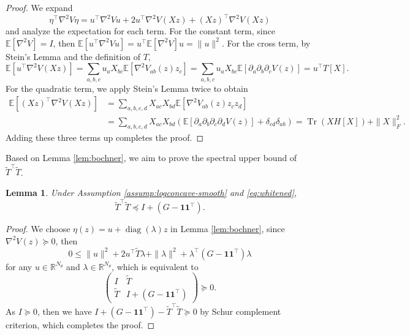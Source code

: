 \documentclass[11pt]{article}
\theoremstyle{plain}
\newtheorem{lemma}[theorem]{Lemma}
\theoremstyle{definition}
\theoremstyle{remark}
\newcommand{\R}{\mathbb{R}}
\newcommand{\E}{\mathbb{E}}
\newcommand{\Tr}{\operatorname{Tr}}
\newcommand{\diag}{\operatorname{diag}}
\begin{document}
\begin{proof}
    We expand 
    \begin{equation*}
        \eta^\top \nabla^2 V \eta = u^\top \nabla^2 V u + 2u^\top \nabla^2 V (Xz) + (Xz)^\top \nabla^2 V (Xz)
    \end{equation*}
    and analyze the expectation for each term.
    For the constant term, since $\E[\nabla^2 V] = I$, then $\E[u^\top \nabla^2 V u] = u^\top \E[\nabla^2 V] u = \|u\|^2$. For the cross term, by Stein's Lemma and the definition of $T$, 
    \begin{equation*}
        \E[u^\top \nabla^2 V (Xz)] = \sum_{a, b, c} u_a X_{bc} \E[\nabla^2 V_{ab} (z) z_c] = \sum_{a, b, c} u_a X_{bc} \E[\partial_a \partial_b \partial_c V (z)] = u^\top T[X].
    \end{equation*}
    For the quadratic term, we apply Stein's Lemma twice to obtain 
    \begin{align*}
        \E[(Xz)^\top \nabla^2 V (Xz)] &= \sum_{a, b, c, d} X_{ac} X_{bd} \E[\nabla^2 V_{ab} (z) z_c z_d] \\
        &= \sum_{a, b, c, d} X_{ac} X_{bd} (\E[\partial_a \partial_b \partial_c \partial_d V (z)] + \delta_{cd} \delta_{ab}) = \Tr(X H[X]) + \|X\|_F^2.
    \end{align*}
    Adding these three terms up completes the proof.
\end{proof}

Based on Lemma \ref{lem:bochner}, we aim to prove the spectral upper bound of $\widetilde{T}^\top \widetilde{T}$.

\begin{lemma}\label{lem:matrix-schur}
    Under Assumption \ref{assump:logconcave-smooth} and \eqref{eq:whitened}, 
    \begin{equation*}
        \widetilde{T}^\top \widetilde{T} \preceq I + (G - \mathbf{1} \mathbf{1}^\top).
    \end{equation*}
\end{lemma}

\begin{proof}
    We choose $\eta (z) = u + \diag (\lambda) z$ in Lemma \ref{lem:bochner}, since $\nabla^2 V(z) \succeq 0$, then
    \begin{equation*}
        0 \leq  \|u\|^2 + 2 u^\top \widetilde{T} \lambda + \|\lambda\|^2 + \lambda^\top (G - \mathbf{1} \mathbf{1}^\top) \lambda
    \end{equation*}
    for any $u \in \R^{N_\theta}$ and $\lambda \in \R^{N_\theta}$, which is equivalent to 
    \begin{equation*}
        \begin{pmatrix}
            I & \widetilde{T} \\
            \widetilde{T} & I + (G - \mathbf{1} \mathbf{1}^\top)
        \end{pmatrix} \succeq 0.
    \end{equation*}
    As $I \succeq 0$, then we have $I + (G - \mathbf{1} \mathbf{1}^\top) - \widetilde{T}^\top \widetilde{T} \succeq 0$ by Schur complement criterion, which completes the proof.
\end{proof}
\end{document}
